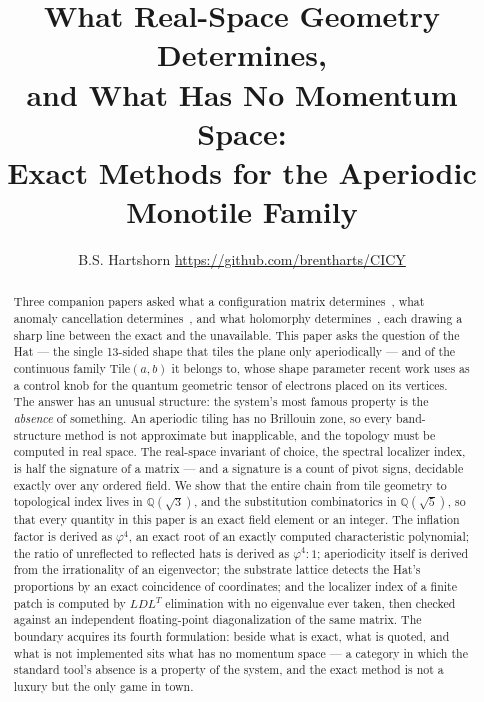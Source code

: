 \documentclass[11pt,a4paper]{article}
\title{\vspace{-1cm}\textbf{What Real-Space Geometry Determines,\\
and What Has No Momentum Space:\\[2pt]
\large Exact Methods for the Aperiodic Monotile Family}}
\author{B.S. Hartshorn \orcidlink{0009-0004-2853-655X} \small \url{https://github.com/brentharts/CICY}}
\newcommand{\QQ}{\mathbb{Q}}
\theoremstyle{definition}
\begin{document}
\maketitle

\begin{abstract}
Three companion papers asked what a configuration matrix
determines~\cite{SuppMath}, what anomaly cancellation
determines~\cite{SuppStrings}, and what holomorphy
determines~\cite{SuppTwistor}, each drawing a sharp line between the exact
and the unavailable. This paper asks the question of the Hat --- the single
13-sided shape that tiles the plane only aperiodically --- and of the
continuous family Tile$(a,b)$ it belongs to, whose shape parameter recent
work uses as a control knob for the quantum geometric tensor of electrons
placed on its vertices. The answer has an unusual structure: the system's
most famous property is the \emph{absence} of something. An aperiodic tiling
has no Brillouin zone, so every band-structure method is not approximate but
inapplicable, and the topology must be computed in real space. The
real-space invariant of choice, the spectral localizer index, is half the
signature of a matrix --- and a signature is a count of pivot signs,
decidable exactly over any ordered field. We show that the entire chain from
tile geometry to topological index lives in $\QQ(\sqrt3)$, and the
substitution combinatorics in $\QQ(\sqrt5)$, so that every quantity in this
paper is an exact field element or an integer. The inflation factor is
derived as $\varphi^4$, an exact root of an exactly computed characteristic
polynomial; the ratio of unreflected to reflected hats is derived as
$\varphi^4 : 1$; aperiodicity itself is derived from the irrationality of an
eigenvector; the substrate lattice detects the Hat's proportions by an exact
coincidence of coordinates; and the localizer index of a finite patch is
computed by $LDL^{T}$ elimination with no eigenvalue ever taken, then checked
against an independent floating-point diagonalization of the same matrix.
The boundary acquires its fourth formulation: beside what is exact, what is
quoted, and what is not implemented sits what has no momentum space --- a
category in which the standard tool's absence is a property of the system,
and the exact method is not a luxury but the only game in town.
\end{abstract}

\tableofcontents

\end{document}
